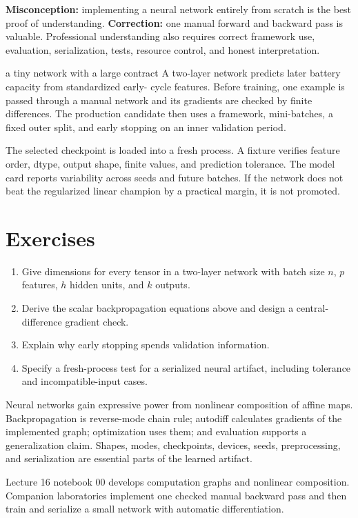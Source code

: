 \begin{misconceptionbox}
\textbf{Misconception:} implementing a neural network entirely from scratch is
the best proof of understanding. \textbf{Correction:} one manual forward and
backward pass is valuable. Professional understanding also requires correct
framework use, evaluation, serialization, tests, resource control, and honest
interpretation.
\end{misconceptionbox}

\begin{workedexample}{a tiny network with a large contract}
A two-layer network predicts later battery capacity from standardized early-
cycle features. Before training, one example is passed through a manual network
and its gradients are checked by finite differences. The production candidate
then uses a framework, mini-batches, a fixed outer split, and early stopping on
an inner validation period.

The selected checkpoint is loaded into a fresh process. A fixture verifies
feature order, dtype, output shape, finite values, and prediction tolerance. The
model card reports variability across seeds and future batches. If the network
does not beat the regularized linear champion by a practical margin, it is not
promoted.
\end{workedexample}

\section{Exercises}
\begin{enumerate}
  \item Give dimensions for every tensor in a two-layer network with batch size
  $n$, $p$ features, $h$ hidden units, and $k$ outputs.
  \item Derive the scalar backpropagation equations above and design a central-
  difference gradient check.
  \item Explain why early stopping spends validation information.
  \item Specify a fresh-process test for a serialized neural artifact, including
  tolerance and incompatible-input cases.
\end{enumerate}

\begin{chapterreview}
Neural networks gain expressive power from nonlinear composition of affine
maps. Backpropagation is reverse-mode chain rule; autodiff calculates gradients
of the implemented graph; optimization uses them; and evaluation supports a
generalization claim. Shapes, modes, checkpoints, devices, seeds, preprocessing,
and serialization are essential parts of the learned artifact.
\end{chapterreview}

\begin{notebooklink}
Lecture 16 notebook 00 develops computation graphs and nonlinear composition.
Companion laboratories implement one checked manual backward pass and then train
and serialize a small network with automatic differentiation.
\end{notebooklink}
